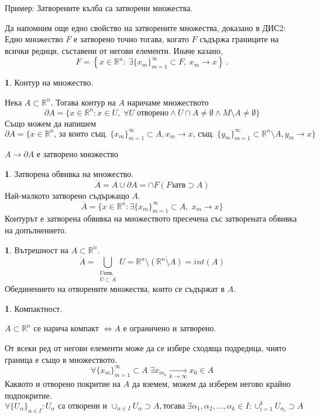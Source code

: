 \documentclass[11pt]{article}
\numberwithin{equation}{section}
\numberwithin{figure}{section}
\numberwithin{table}{section}
\theoremstyle{plain}
\theoremstyle{definition}
\newtheorem{defn}[thm]{\protect\definitionname}
\theoremstyle{remark}
\theoremstyle{definition}
\theoremstyle{remark}
\theoremstyle{plain}
\theoremstyle{definition}
\theoremstyle{definition}
\theoremstyle{plain}
\theoremstyle{plain}
\theoremstyle{plain}
\theoremstyle{definition}
\theoremstyle{plain}
\providecommand{\definitionname}{Дефиниция}
\newcommand*{\R}{\mathbb{R}}
\begin{document}
\noindent Пример: Затворените кълба са затворени множества.

Да напомним още едно свойство на затворените множества, доказано в ДИС2: Едно множество $F$ е затворено точно тогава, когато $F$ съдържа границите на всички редици, съставени от негови елементи. Иначе казано, 
$$F = \left\{ x\in \R^n : \ \exists \{x_m\}_{m=1}^\infty \subset F, \ x_m \rightarrow x \right\} \ .$$


\begin{defn}
Контур на множество.

\noindent Нека $A \subset \R^n$. Тогава контур на $A$ наричаме множеството
$$\partial A = \{ x\in \R^n : x\in U, \; \forall U \; \text{отворено} \land U \cap A \neq \emptyset \land M \setminus A \neq \emptyset \}$$
Също можем да напишем
$$\partial A = \{x \in \R^n \text{, за които същ. } \{x_m\}_{m=1}^\infty \subset A, x_m \rightarrow x \text{, същ. } \{y_m\}_{m=1}^\infty \subset \R^n\setminus A, y_m \rightarrow x\}$$
\end{defn}

$A \rightarrow \partial A$ е затворено множество

\begin{defn}
Затворена обвивка на множество.
$$\overline{A} = A \cup \partial A = \cap F (F \text{затв} \supset A)$$
Най-малкото затворено съдържащо $A$.
$$\overline{A} = \{x\in\R^n: \exists \{x_m\}_{m=1}^\infty \subset A,\; x_m \rightarrow x \}$$
Контурът е затворена обвивка на множеството пресечена със затворената обвивка на допълнението.
\end{defn}

\begin{defn}
Вътрешност на $A\subset\R^n$.
$$\mathring{A} = \bigcup_{\substack{U \text{отв.}\\ U \subset A}} U = \R^n \setminus \overline{(\R^n\setminus A)} = int(A)$$
Обединението на отворените множества, които се съдържат в $A$.
\end{defn}

\begin{defn}
Компактност.

\noindent $A\subset \R^n$ се нарича компакт $\iff A$ е ограничено и затворено.

От всеки ред от негови елементи може да се избере сходяща подредица, чиято граница е също в множеството.
$$\forall\{x_m\}_{m=1}^\infty \subset A \; \exists x_{m_k} \xrightarrow[k\rightarrow \infty]{} x_0 \in A$$
Каквото и отворено покритие на $A$ да вземем, можем да изберем негово крайно подпокритие.
$$\forall \{U_\alpha\}_{\alpha \in I} : U_\alpha \text{ са отворени и } \cup_{\alpha\in I} U_\alpha \supset A, \text{тогава} \; \exists \alpha_1, \alpha_2, ..., \alpha_k \in I : \cup_{i=1}^k U_{\alpha_i} \supset A$$
\end{defn}
\end{document}
